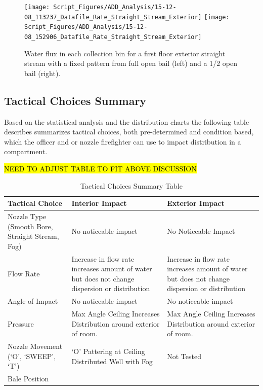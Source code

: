 \documentclass[12pt,oneside]{book}
\begin{document}
\begin{figure}[ht]
\texttt{[image: Script\_Figures/ADD\_Analysis/15-12-08\_113237\_Datafile\_Rate\_Straight\_Stream\_Exterior]}
\texttt{[image: Script\_Figures/ADD\_Analysis/15-12-08\_152906\_Datafile\_Rate\_Straight\_Stream\_Exterior]} \\ 
\caption[Water Flux Varying Bail Opening Straight Stream]{Water flux in each collection bin for a first floor exterior straight stream with a fixed pattern from full open bail (left) and a 1/2 open bail (right).}
\label{fig:SS_Exterior_First_Floor_Varying_Bail}
\end{figure}

\clearpage

\subsection{Tactical Choices Summary}

Based on the statistical analysis and the distribution charts the following table describes summarizes tactical choices, both pre-determined and condition based, which the officer and or nozzle firefighter can use to impact distribution in a compartment.

\hl{NEED TO ADJUST TABLE TO FIT ABOVE DISCUSSION}

\begin{table}[!ht]
\centering
\caption{Tactical Choices Summary Table}
\label{tab:tac_choice}
\begin{tabular}{L{5cm}L{5cm}L{5cm}}
\toprule[1.5pt]
Tactical Choice & Interior Impact & Exterior Impact \\
\midrule
Nozzle Type (Smooth Bore, Straight Stream, Fog) & No noticeable impact & No Noticeable Impact \\ [.5cm]
Flow Rate & Increase in flow rate increases amount of water but does not change dispersion or distribution & Increase in flow rate increases amount of water but does not change dispersion or distribution \\ [.5cm]
Angle of Impact & No noticeable impact & No noticeable impact \\ [.5cm]
Pressure & Max Angle Ceiling Increases Distribution around exterior of room.  & Max Angle Ceiling Increases Distribution around exterior of room. \\ [.5cm]
Nozzle Movement (`O', `SWEEP', `T') & `O' Pattering at Ceiling Distributed Well with Fog & Not Tested \\ [.5cm]
Bale Position & & \\ [.5cm]

\bottomrule[1.25pt]
\end{tabular}
\end{table}
\end{document}
